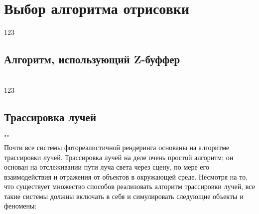 \section{Выбор алгоритма отрисовки}

123

\subsection{Алгоритм, использующий Z-буффер}\mbox{} \\
123~\cite{Rodzhers}

\subsection{Трассировка лучей}""\\

Почти все системы фотореалистичной рендеринга основаны на алгоритме трассировки лучей. 
Трассировка лучей на деле очень простой алгоритм; он основан на отслеживании пути луча света 
через сцену, по мере его взаимодействия и отражения от объектов в окружающей среде.
Несмотря на то, что существует множество способов реализовать алгоритм трассировки лучей, 
все такие системы должны включать в себя и симулировать следующие объекты и феномены:

